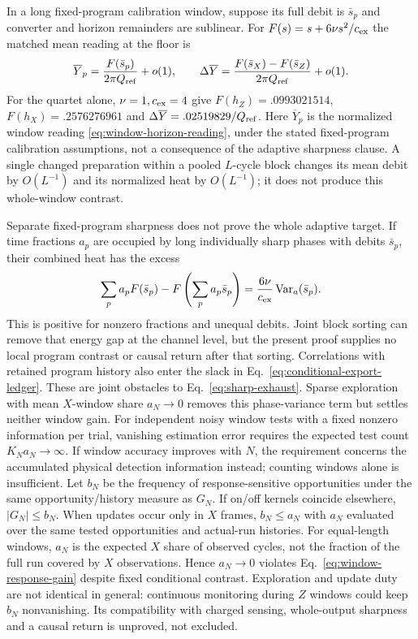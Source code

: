 In a long fixed-program calibration window, suppose its full debit is
$\bar s_p$ and converter and horizon remainders are sublinear.
For $F(s)=s+6\nu s^2/c_{\rm ex}$ the matched mean reading at the floor is
\begin{equation}\label{eq:pointer-gain}
 \overline Y_p=\frac{F(\bar s_p)}{2\pi Q_{\rm ref}}+o(1),\qquad
 \Delta\overline Y=\frac{F(\bar s_X)-F(\bar s_Z)}{2\pi Q_{\rm ref}}+o(1).
\end{equation}
For the quartet alone, $\nu=1,c_{\rm ex}=4$ give
$F(h_Z)=.0993021514$, $F(h_X)=.2576276961$ and
$\Delta\overline Y=.02519829/Q_{\rm ref}$.
Here $\overline Y_p$ is the normalized window reading
\eqref{eq:window-horizon-reading}, under the stated fixed-program
calibration assumptions, not a consequence of the adaptive sharpness
clause. A single changed preparation within a pooled $L$-cycle block
changes its mean debit by $O(L^{-1})$ and its normalized heat by
$O(L^{-1})$; it does not produce this whole-window contrast.

Separate fixed-program sharpness does not prove the whole adaptive
target. If time fractions $a_p$ are occupied by long individually sharp
phases with debits $\bar s_p$, their combined heat has the excess
\begin{equation}\label{eq:adaptive-jensen-gap}
 \sum_pa_pF(\bar s_p)-F\left(\sum_pa_p\bar s_p\right)
 =\frac{6\nu}{c_{\rm ex}}\operatorname{Var}_a(\bar s_p).
\end{equation}
This is positive for nonzero fractions and unequal debits. Joint block
sorting can remove that energy gap at the channel level, but the present
proof supplies no local program contrast or causal return after that
sorting. Correlations with retained program history also enter the
slack in Eq.~\eqref{eq:conditional-export-ledger}. These are joint
obstacles to Eq.~\eqref{eq:sharp-exhaust}. Sparse exploration with mean $X$-window share $a_N\to0$ removes this
phase-variance term but settles neither window gain. For independent
noisy window tests with a fixed nonzero information per trial, vanishing
estimation error requires the expected test count $K_Na_N\to\infty$. If window accuracy improves
with $N$, the requirement concerns the accumulated physical detection
information instead; counting windows alone is insufficient.
Let $b_N$ be the frequency of response-sensitive opportunities under
the same opportunity/history measure as $G_N$. If on/off kernels
coincide elsewhere, $|G_N|\le b_N$. When updates occur only in $X$
frames, $b_N\le a_N$ with $a_N$ evaluated over the same tested
opportunities and actual-run histories. For equal-length windows,
$a_N$ is the expected $X$ share of observed cycles, not the fraction
of the full run covered by $X$ observations. Hence $a_N\to0$ violates
Eq.~\eqref{eq:window-response-gain} despite fixed conditional contrast.
Exploration and update duty are not
identical in general: continuous monitoring during $Z$ windows could
keep $b_N$ nonvanishing. Its compatibility with charged sensing,
whole-output sharpness and a causal return is unproved, not excluded.

